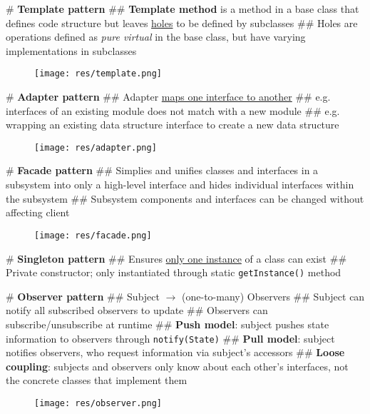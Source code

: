 \documentclass[11pt, oneside]{article}
\begin{document}
# \textbf{Template pattern}
## \textbf{Template method} is a method in a base class that defines code structure but leaves \underline{holes} to be defined by subclasses
## Holes are operations defined as \emph{pure virtual} in the base class, but have varying implementations in subclasses

\begin{figure}[!ht]
    \centering
    \texttt{[image: res/template.png]}
\end{figure}

\newpage

# \textbf{Adapter pattern}
## Adapter \underline{maps one interface to another}
## e.g. interfaces of an existing module does not match with a new module
## e.g. wrapping an existing data structure interface to create a new data structure

\begin{figure}[!ht]
    \centering
    \texttt{[image: res/adapter.png]}
\end{figure}

# \textbf{Facade pattern}
## Simplies and unifies classes and interfaces in a subsystem into only a high-level interface and hides individual interfaces within the subsystem
## Subsystem components and interfaces can be changed without affecting client

\begin{figure}[!ht]
    \centering
    \texttt{[image: res/facade.png]}
\end{figure}

# \textbf{Singleton pattern}
## Ensures \underline{only one instance} of a class can exist
## Private constructor; only instantiated through static \texttt{getInstance()} method

\newpage
# \textbf{Observer pattern}
## Subject $\rightarrow$ (one-to-many) Observers
## Subject can notify all subscribed observers to update
## Observers can subscribe/unsubscribe at runtime
## \textbf{Push model}: subject pushes state information to observers through \texttt{notify(State)}
## \textbf{Pull model}: subject notifies observers, who request information via subject's accessors
## \textbf{Loose coupling}: subjects and observers only know about each other's interfaces, not the concrete classes that implement them

\begin{figure}[!ht]
    \centering
    \texttt{[image: res/observer.png]}
\end{figure}
\end{document}
